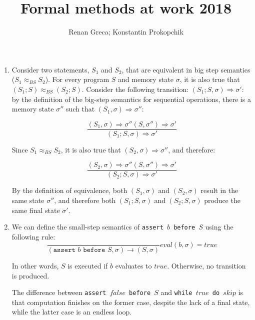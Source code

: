 \documentclass[11pt]{article}
\begin{document}
\title{Formal methods at work 2018}
\author{Renan Greca; Konstantin Prokopchik}

\maketitle

\begin{enumerate}
	\item Consider two statements, $S_1$ and $S_2$, that are equivalent in big step semantics ($S_1 \approx_{BS} S_2$).
		For every program $S$ and memory state $
	\sigma$, it is also true that $(S_1;S) \approx_{BS} (S_2;S)$.
		Consider the following transition: $(S_1;S,\sigma)\Rightarrow\sigma'$: by the definition of the big-step semantics for sequential operations, there is a memory state $\sigma''$ such that $(S_1,\sigma)\Rightarrow\sigma''$:
		
		\begin{equation*}
			\frac{(S_1,\sigma)\Rightarrow\sigma'' (S,\sigma'')\Rightarrow\sigma'}{(S_1;S,\sigma)\Rightarrow\sigma'} 
		\end{equation*}
		
		Since $S_1\approx_{BS} S_2$, it is also true that $(S_2,\sigma)\Rightarrow\sigma''$, and therefore:
		
		\begin{equation*}
			\frac{(S_2,\sigma)\Rightarrow\sigma'' (S,\sigma'')\Rightarrow\sigma'}{(S_2;S,\sigma)\Rightarrow\sigma'}
		\end{equation*}
		
		By the definition of equivalence, both $(S_1,\sigma)$ and $(S_2,\sigma)$ result in the same state $\sigma''$, and therefore both $(S_1;S,\sigma)$ and $(S_2;S,\sigma)$ produce the same final state $\sigma'$.
				
	\item We can define the small-step semantics of \texttt{assert $b$ before $S$} using the following rule:
		\begin{equation*}
			\frac{}{(\texttt{assert }b\texttt{ before }S,\sigma)\rightarrow (S,\sigma)}eval(b,\sigma)=true
		\end{equation*}
		
		In other words, $S$ is executed if $b$ evaluates to $true$. Otherwise, no transition is produced.
		
		The difference between \texttt{assert $false$ before $S$} and \texttt{while $true$ do $skip$} is that computation finishes on the former case, despite the lack of a final state, while the latter case is an endless loop.
		

\end{enumerate}
\end{document}
